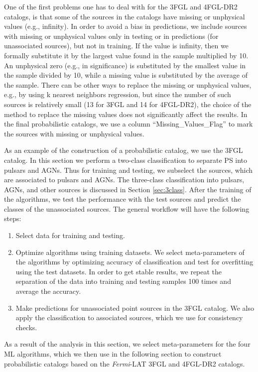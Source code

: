 \documentclass{aa}
\newcommand{\ben}{\begin{enumerate}}
\newcommand{\een}{\end{enumerate}}
\newcommand{\Fermi}{\textit{Fermi}\xspace}
\begin{document}
One of the first problems one has to deal with for the 3FGL and 4FGL-DR2 catalogs, is that
some of the sources in the catalogs have missing or unphysical values (e.g., infinity).
In order to avoid a bias in predictions, we include sources with missing or unphysical values only in testing or in predictions (for unassociated sources), but not in training.
If the value is infinity, then we formally substitute it by the largest value found in the sample multiplied by 10.
An unphysical zero (e.g., in significance) is substituted by the smallest value in the sample divided by 10,
while a missing value is substituted by the average of the sample.
There can be other ways to replace the missing or unphysical values, e.g., by using k nearest neighbors regression, 
but since the number of such sources is relatively small (13 for 3FGL and 14 for 4FGL-DR2), 
the choice of the method to replace the missing values does not significantly affect the results.
In the final probabilistic catalogs, we use a column ``Missing\_Values\_Flag'' to mark 
the sources with missing or unphysical values.

As an example of the construction of a probabilistic catalog, we use the 3FGL catalog.
In this section we perform a two-class classification to separate PS into pulsars and AGNs.
Thus for training and testing, we subselect the sources, which are associated to pulsars and AGNs.
The three-class classification into pulsars, AGNs, and other sources is discussed in Section \ref{sec:3class}.
After the training of the algorithms, we test the performance with the test sources and predict the classes of the unassociated sources.
The general workflow will have the following steps:
\ben
\item
Select data for training and testing.
\item
Optimize algorithms using training datasets.
We select meta-parameters of the algorithms by optimizing accuracy of classification and test for overfitting using the test datasets.
In order to get stable results, we repeat the separation of the data into training and testing samples 100 times and 
average the accuracy.
\item
Make predictions for unassociated point sources in the 3FGL catalog.
We also apply the classification to associated sources, which we use for consistency checks.
\een
As a result of the analysis in this section, we select meta-parameters for the four ML algorithms,
which we then use in the following section to construct probabilistic catalogs
based on the \Fermi-LAT 3FGL and 4FGL-DR2 catalogs.
\end{document}
